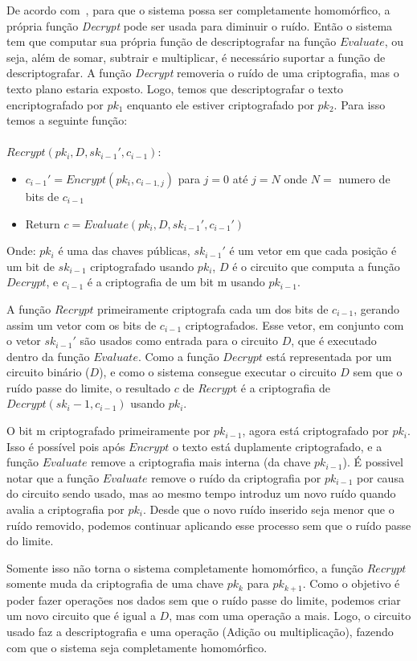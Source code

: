De acordo com~\cite{easyfhe}, para que o sistema possa ser completamente homomórfico, a própria função \textit{Decrypt} pode ser usada para diminuir o ruído.
Então o sistema tem que computar sua própria função de descriptografar na função $Evaluate$, ou seja, além de somar, subtrair e multiplicar, é necessário suportar a função de descriptografar.
A função \textit{Decrypt} removeria o ruído de uma criptografia, mas o texto plano estaria exposto. Logo, temos que descriptografar o texto encriptografado por $pk_1$ enquanto ele estiver criptografado por $pk_2$. Para isso temos a seguinte função:
\\\\
$Recrypt(pk_i , D, sk_{i-1}', c_{i-1})$:
\begin{itemize}
	\item $c_{i-1}' = Encrypt(pk_i, c_{i-1,j})$ para $j = 0$ até $j = N$ onde $N =$ numero de bits de $c_{i-1}$
	\item Return $c = Evaluate(pk_i, D, sk_{i-1}', c_{i-1}')$
\end{itemize}
Onde: $pk_i$ é uma das chaves públicas, $sk_{i-1}'$ é um vetor em que cada posição é um bit de $sk_{i-1}$ criptografado usando $pk_i$, $D$ é o circuito que computa a função $Decrypt$, e $c_{i-1}$ é a criptografia de um bit m usando $pk_{i-1}$.
  
A função $Recrypt$ primeiramente criptografa cada um dos bits de $c_{i-1}$, gerando assim um vetor com os bits de $c_{i-1}$ criptografados.
Esse vetor, em conjunto com o vetor $sk_{i-1}'$ são usados como entrada para o circuito $D$, que é executado dentro da função $Evaluate$.
Como a função $Decrypt$ está representada por um circuito binário ($D$), e como o sistema consegue executar o circuito $D$ sem que o ruído passe do limite, o resultado $c$ de $Recryp$t é a criptografia de $Decrypt(sk_i-1, c_{i-1})$ usando $pk_i$.
  
O bit m criptografado primeiramente por $pk_{i-1}$, agora está criptografado por $pk_{i}$.
Isso é possível pois após $Encrypt$ o texto está duplamente criptografado, e a função $Evaluate$ remove a criptografia mais interna (da chave $pk_{i-1}$).
É possivel notar que a função $Evaluate$ remove o ruído da criptografia por $pk_{i-1}$ por causa do circuito sendo usado, mas ao mesmo tempo introduz um novo ruído quando avalia a criptografia por $pk_i$.
Desde que o novo ruído inserido seja menor que o ruído removido, podemos continuar aplicando esse processo sem que o ruído passe do limite.
  
Somente isso não torna o sistema completamente homomórfico, a função $Recrypt$ somente muda da criptografia de uma chave $pk_k$ para $pk_{k+1}$.
Como o objetivo é poder fazer operações nos dados sem que o ruído passe do limite, podemos criar um novo circuito que é igual a $D$, mas com uma operação a mais.
Logo, o circuito usado faz a descriptografia e uma operação (Adição ou multiplicação), fazendo com que o sistema seja completamente homomórfico.
  
